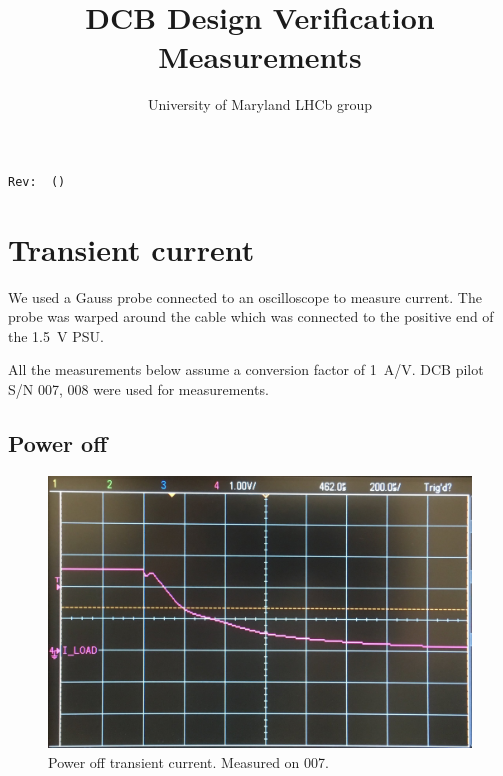 \documentclass[11pt,letterpaper]{refart}
\title{DCB Design Verification Measurements}
\author{University of Maryland LHCb group}
\begin{document}
\maketitle
\hfill\small{\texttt{Rev:~\gitRel~(\gitAbbrevHash)}}
\tableofcontents


\section{Transient current}
We used a Gauss probe connected to an oscilloscope to measure current.
The probe was warped around the cable which was connected to the positive end of
the \SI{1.5}{\volt} PSU.

All the measurements below assume a conversion factor of \SI{1}{\ampere/\volt}.
DCB pilot S/N 007, 008 were used for measurements.

\subsection{Power off}
\begin{figure}[ht]
    \centering
    \includegraphics[width=0.8\linewidth]{./res/current_transient/power_off.jpg}
    \caption{Power off transient current. Measured on 007.}
\end{figure}
\end{document}
